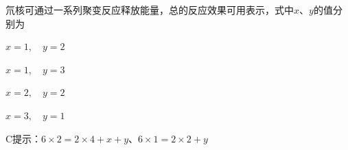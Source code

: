 氘核可通过一系列聚变反应释放能量，总的反应效果可用表示，式中\(x\)、\(y\)的值分别为\paren[C]
\begin{choices}
	\item \(x = 1,\quad y = 2\)
	\item \(x = 1,\quad y = 3\)
	\item \(x = 2,\quad y = 2\)
	\item \(x = 3,\quad y = 1\)
\end{choices}
\begin{answer}
	C\qquad 提示：\(6 \times 2 = 2 \times 4 + x + y\)、\(6 \times 1 = 2 \times 2 + y\)
\end{answer}